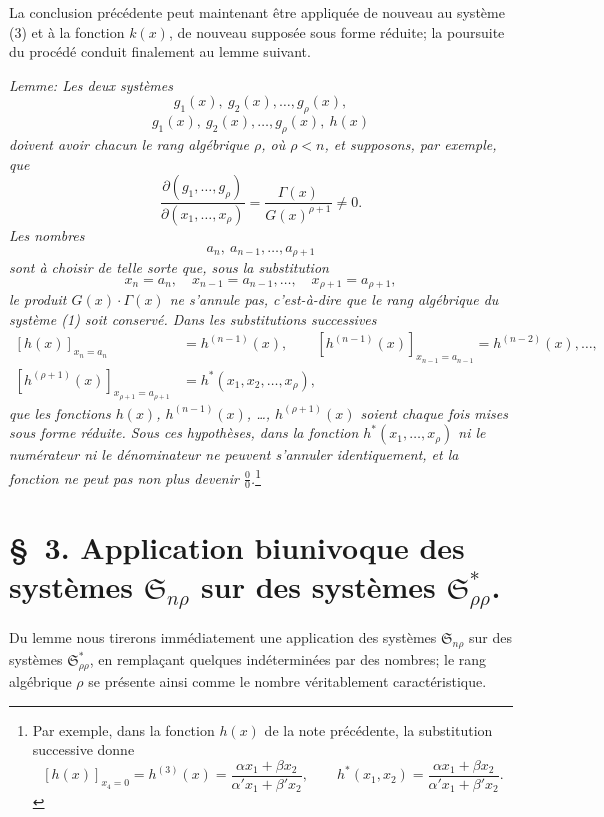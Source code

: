 \documentclass[11pt]{article}
\providecommand{\Ssys}{\mathfrak{S}}
\begin{document}
La conclusion précédente peut maintenant être appliquée de nouveau au système (3) et à la fonction $k(x)$, de nouveau supposée sous forme réduite; la poursuite du procédé conduit finalement au lemme suivant.

\emph{Lemme: Les deux systèmes}
\[
  g_1(x),\ g_2(x),\ldots,g_\rho(x),
\]
\[
  g_1(x),\ g_2(x),\ldots,g_\rho(x),\ h(x)
\]
\emph{doivent avoir chacun le rang algébrique $\rho$, où $\rho<n$, et supposons, par exemple, que}
\[
 \frac{\partial(g_1,\ldots,g_\rho)}{\partial(x_1,\ldots,x_\rho)}
 =\frac{\Gamma(x)}{G(x)^{\rho+1}}\ne0.
\]
\emph{Les nombres}
\[
  a_n,\ a_{n-1},\ldots,a_{\rho+1}
\]
\emph{sont à choisir de telle sorte que, sous la substitution}
\[
  x_n=a_n,\quad x_{n-1}=a_{n-1},\ldots,\quad x_{\rho+1}=a_{\rho+1},
\]
\emph{le produit $G(x)\cdot\Gamma(x)$ ne s'annule pas, c'est-à-dire que le rang algébrique du système (1) soit conservé. Dans les substitutions successives}
\[
\begin{aligned}
 [h(x)]_{x_n=a_n}&=h^{(n-1)}(x),\qquad
 [h^{(n-1)}(x)]_{x_{n-1}=a_{n-1}}=h^{(n-2)}(x),\ldots,\\
 [h^{(\rho+1)}(x)]_{x_{\rho+1}=a_{\rho+1}}&=h^*(x_1,x_2,\ldots,x_\rho),
\end{aligned}
\]
\emph{que les fonctions $h(x)$, $h^{(n-1)}(x)$, \ldots, $h^{(\rho+1)}(x)$ soient chaque fois mises sous forme réduite. Sous ces hypothèses, dans la fonction $h^*(x_1,\ldots,x_\rho)$ ni le numérateur ni le dénominateur ne peuvent s'annuler identiquement, et la fonction ne peut pas non plus devenir $\frac{0}{0}$.}\footnote{Par exemple, dans la fonction $h(x)$ de la note précédente, la substitution successive donne
\[
 [h(x)]_{x_4=0}=h^{(3)}(x)=\frac{\alpha x_1+\beta x_2}{\alpha' x_1+\beta' x_2},\qquad
 h^*(x_1,x_2)=\frac{\alpha x_1+\beta x_2}{\alpha' x_1+\beta' x_2}.
\]}

\section*{\S\ 3. Application biunivoque des systèmes $\Ssys_{n\rho}$ sur des systèmes $\Ssys^*_{\rho\rho}$.}

Du lemme nous tirerons immédiatement une application des systèmes $\Ssys_{n\rho}$ sur des systèmes $\Ssys^*_{\rho\rho}$, en remplaçant quelques indéterminées par des nombres; le rang algébrique $\rho$ se présente ainsi comme le nombre véritablement caractéristique.
\end{document}
